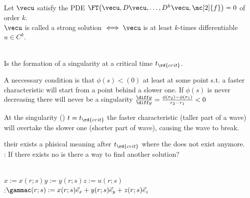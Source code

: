 \begin{defnbox}
    \begin{defn}\leavevmode \\
        Let $\vecu$ satisfy the PDE $\FT\big(\vecu,D\vecu,\ldots,D^k\vecu,\mc[2]{f}\big)=0$ of order $k$.\\
        $\vecu$ is called a strong solution $\iff \vecu$ is at least $k$-times differentiable $u\in C^k$.
    \end{defn}
\end{defnbox}
\begin{defnbox}
    \begin{defn}[Shockwave]\leavevmode \\
        Is the formation of a singularity at a critical time $t_{\rd{crit}}$.
    \end{defn}
\end{defnbox}
\begin{notebox}
    A neccessary condition is that $\phi(s)<(0)$ at least at some point s.t. a faster characteristic will start from a point
    behind a slower one. If $\phi(s)$ is never decreasing there will never be a singularity
    $\frac{\diff y}{\diff y}=\frac{\phi(r_2)-\phi(r_1)}{r_2-r_1}<0$
\end{notebox}
\begin{notebox}
 At the singularity () $t=t_{\rd{crit}}$ the faster characteristic (taller part of a wave) will overtake the slower one
 (shorter part of wave), causing the wave to break.
    \begin{figure}[H]
        \centering{
            \def\svgwidth{150pt}
            \resizebox{0.8\linewidth}{!}{}
        }
    \end{figure}
     their exists a phisical meaning after $t_{\rd{crit}}$ where the  does not exist anymore.\\
    : If there exists no  is there a way to find another solution?
\end{notebox}
\begin{emphbox}\leavevmode\\
    $x:=x(r;s)$\hfil$y:=y(r;s)$\hfil$z:=u(r;s)$\\
    :\hfil$\gammac(r;s):=x(r;s)\vec{e}_x+y(r;s)\vec{e}_y+z(r;s)\vec{e}_z$\\
    \\
     
    \\
    \\
\end{emphbox}

